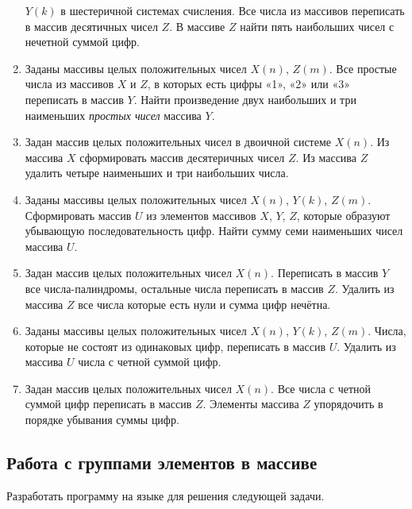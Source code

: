\begin{enumerate}
$Y(k)$ в  шестеричной системах счисления. Все числа из массивов переписать в массив десятичных
чисел $Z$. В массиве $Z$ найти пять наибольших чисел с нечетной суммой цифр.
\item Заданы массивы целых положительных чисел $X(n)$, $Z(m)$. Все
простые числа из массивов $X$ и $Z$, в которых есть цифры «1», «2» или «3» переписать в
массив $Y$. Найти произведение двух наибольших и три наименьших \emph{простых
чисел} массива $Y$.
\item Задан массив целых положительных чисел в двоичной системе $X(n)$. Из массива
$X$ сформировать массив десятеричных чисел $Z$. Из массива $Z$ удалить
четыре наименьших и три наибольших числа.
\item Заданы массивы целых положительных чисел $X(n)$, $Y(k)$,
$Z(m)$. Сформировать массив $U$ из элементов массивов $X$,
$Y$, $Z$, которые образуют убывающую последовательность цифр. Найти сумму семи
наименьших чисел массива $U$.
\item Задан массив целых положительных чисел $X(n)$. Переписать в массив $Y$
все числа-палиндромы, остальные числа переписать в массив $Z$. Удалить из массива $Z$ все числа
которые есть нули и сумма цифр нечётна.
\item Заданы массивы целых положительных чисел $X(n)$, $Y(k)$,
$Z(m)$. Числа, которые не состоят из одинаковых цифр, переписать в массив $U$.
Удалить из массива $U$ числа с четной суммой цифр.
\item Задан массив целых положительных чисел $X(n)$. Все числа с четной суммой цифр  переписать
в массив $Z$. Элементы массива $Z$ упорядочить в порядке убывания суммы цифр.
\end{enumerate}

\subsection[Работа с группами элементов в массиве]{Работа с группами элементов в массиве}
Разработать программу на языке  для решения следующей задачи.

